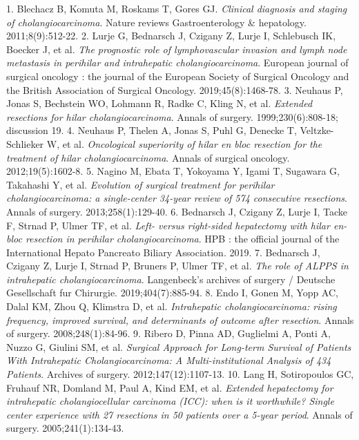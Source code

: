 \documentclass[12pt]{article}
\begin{document}
\begin{thebibliography}{22}
1.	Blechacz B, Komuta M, Roskams T, Gores GJ. \textit{Clinical diagnosis and staging of cholangiocarcinoma}. Nature reviews Gastroenterology \& hepatology. 2011;8(9):512-22.
2.	Lurje G, Bednarsch J, Czigany Z, Lurje I, Schlebusch IK, Boecker J, et al. \textit{The prognostic role of lymphovascular invasion and lymph node metastasis in perihilar and intrahepatic cholangiocarcinoma}. European journal of surgical oncology : the journal of the European Society of Surgical Oncology and the British Association of Surgical Oncology. 2019;45(8):1468-78.
3.	Neuhaus P, Jonas S, Bechstein WO, Lohmann R, Radke C, Kling N, et al. \textit{Extended resections for hilar cholangiocarcinoma}. Annals of surgery. 1999;230(6):808-18; discussion 19.
4.	Neuhaus P, Thelen A, Jonas S, Puhl G, Denecke T, Veltzke-Schlieker W, et al. \textit{Oncological superiority of hilar en bloc resection for the treatment of hilar cholangiocarcinoma}. Annals of surgical oncology. 2012;19(5):1602-8.
5.	Nagino M, Ebata T, Yokoyama Y, Igami T, Sugawara G, Takahashi Y, et al. \textit{Evolution of surgical treatment for perihilar cholangiocarcinoma: a single-center 34-year review of 574 consecutive resections}. Annals of surgery. 2013;258(1):129-40.
6.	Bednarsch J, Czigany Z, Lurje I, Tacke F, Strnad P, Ulmer TF, et al. \textit{Left- versus right-sided hepatectomy with hilar en-bloc resection in perihilar cholangiocarcinoma}. HPB : the official journal of the International Hepato Pancreato Biliary Association. 2019.
7.	Bednarsch J, Czigany Z, Lurje I, Strnad P, Bruners P, Ulmer TF, et al. \textit{The role of ALPPS in intrahepatic cholangiocarcinoma}. Langenbeck's archives of surgery / Deutsche Gesellschaft fur Chirurgie. 2019;404(7):885-94.
8.	Endo I, Gonen M, Yopp AC, Dalal KM, Zhou Q, Klimstra D, et al. \textit{Intrahepatic cholangiocarcinoma: rising frequency, improved survival, and determinants of outcome after resection}. Annals of surgery. 2008;248(1):84-96.
9.	Ribero D, Pinna AD, Guglielmi A, Ponti A, Nuzzo G, Giulini SM, et al. \textit{Surgical Approach for Long-term Survival of Patients With Intrahepatic Cholangiocarcinoma: A Multi-institutional Analysis of 434 Patients}. Archives of surgery. 2012;147(12):1107-13.
10.	Lang H, Sotiropoulos GC, Fruhauf NR, Domland M, Paul A, Kind EM, et al. \textit{Extended hepatectomy for intrahepatic cholangiocellular carcinoma (ICC): when is it worthwhile? Single center experience with 27 resections in 50 patients over a 5-year period}. Annals of surgery. 2005;241(1):134-43.

\end{thebibliography}
\end{document}
